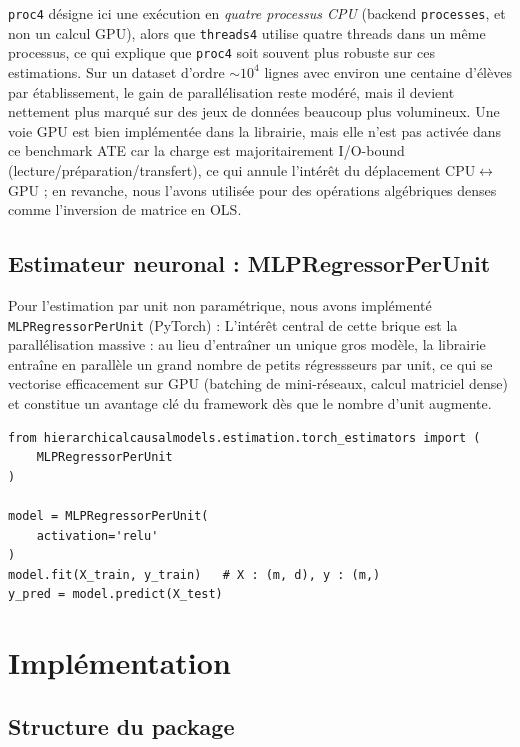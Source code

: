 \documentclass[11pt,a4paper]{article}
\begin{document}
\texttt{proc4} désigne ici une exécution en \emph{quatre processus CPU} (backend \texttt{processes}, et non un calcul GPU), alors que \texttt{threads4} utilise quatre threads dans un même processus, ce qui explique que \texttt{proc4} soit souvent plus robuste sur ces estimations.
Sur un dataset d'ordre $\sim 10^4$ lignes avec environ une centaine d'élèves par établissement, le gain de parallélisation reste modéré, mais il devient nettement plus marqué sur des jeux de données beaucoup plus volumineux.
Une voie GPU est bien implémentée dans la librairie, mais elle n'est pas activée dans ce benchmark ATE car la charge est majoritairement I/O-bound (lecture/préparation/transfert), ce qui annule l'intérêt du déplacement CPU$\leftrightarrow$GPU ; en revanche, nous l'avons utilisée pour des opérations algébriques denses comme l'inversion de matrice en OLS.

\subsection{Estimateur neuronal : MLPRegressorPerUnit}

Pour l'estimation par unit non paramétrique, nous avons implémenté \texttt{MLPRegressorPerUnit} (PyTorch) :
L'intérêt central de cette brique est la parallélisation massive : au lieu d'entraîner un unique gros modèle, la librairie entraîne en parallèle un grand nombre de petits régressseurs par unit, ce qui se vectorise efficacement sur GPU (batching de mini-réseaux, calcul matriciel dense) et constitue un avantage clé du framework dès que le nombre d'unit augmente.

\begin{lstlisting}[caption={\texttt{MLPRegressorPerUnit}}]
from hierarchicalcausalmodels.estimation.torch_estimators import (
    MLPRegressorPerUnit
)

model = MLPRegressorPerUnit(
    activation='relu'
)
model.fit(X_train, y_train)   # X : (m, d), y : (m,)
y_pred = model.predict(X_test)
\end{lstlisting}

\section{Implémentation}
\label{sec:implementation}

\subsection{Structure du package}
\end{document}
